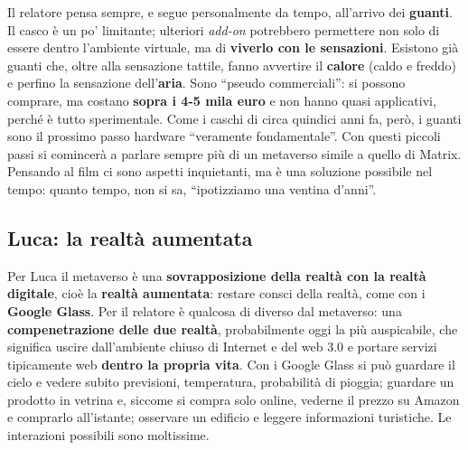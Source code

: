Il relatore pensa sempre, e segue personalmente da tempo, all'arrivo dei
\textbf{guanti}. Il casco è un po' limitante; ulteriori \emph{add-on} potrebbero
permettere non solo di essere dentro l'ambiente virtuale, ma di
\textbf{viverlo con le sensazioni}. Esistono già guanti che, oltre alla
sensazione tattile, fanno avvertire il \textbf{calore} (caldo e freddo) e perfino
la sensazione dell'\textbf{aria}. Sono ``pseudo commerciali'': si possono
comprare, ma costano \textbf{sopra i 4-5 mila euro} e non hanno quasi
applicativi, perché è tutto sperimentale. Come i caschi di circa quindici anni
fa, però, i guanti sono il prossimo passo hardware ``veramente fondamentale''.
Con questi piccoli passi si comincerà a parlare sempre più di un metaverso
simile a quello di Matrix. Pensando al film ci sono aspetti inquietanti, ma è
una soluzione possibile nel tempo: quanto tempo, non si sa, ``ipotizziamo una
ventina d'anni''.

\subsection{Luca: la realtà aumentata}

Per Luca il metaverso è una \textbf{sovrapposizione della realtà con la realtà
digitale}, cioè la \textbf{realtà aumentata}: restare consci della realtà, come
con i \textbf{Google Glass}. Per il relatore è qualcosa di diverso dal
metaverso: una \textbf{compenetrazione delle due realtà}, probabilmente oggi la
più auspicabile, che significa uscire dall'ambiente chiuso di Internet e del
web 3.0 e portare servizi tipicamente web \textbf{dentro la propria vita}. Con
i Google Glass si può guardare il cielo e vedere subito previsioni, temperatura,
probabilità di pioggia; guardare un prodotto in vetrina e, siccome si compra solo
online, vederne il prezzo su Amazon e comprarlo all'istante; osservare un
edificio e leggere informazioni turistiche. Le interazioni possibili sono
moltissime.

